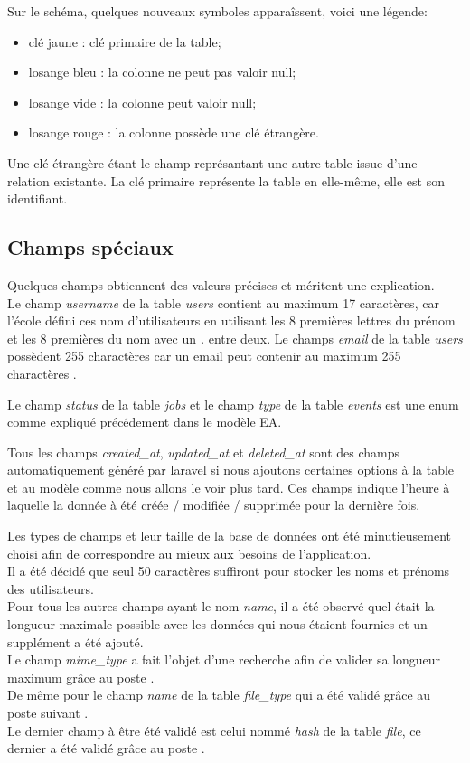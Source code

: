 \documentclass[
    iai, %
    il, %
]{heig-tb}
\begin{document}
Sur le schéma, quelques nouveaux symboles apparaîssent, voici une légende:
\begin{itemize}
    \item clé jaune : clé primaire de la table;
    \item losange bleu : la colonne ne peut pas valoir null;
    \item losange vide : la colonne peut valoir null;
    \item losange rouge : la colonne possède une clé étrangère.
\end{itemize}

Une clé étrangère étant le champ représantant une autre table issue d'une relation existante. La clé primaire représente la table en elle-même, elle est son identifiant.

\subsection{Champs spéciaux}
Quelques champs obtiennent des valeurs précises et méritent une explication.\\
Le champ \emph{username} de la table \emph{users} contient au maximum 17 caractères, car l'école défini ces nom d'utilisateurs en utilisant les 8 premières lettres du prénom et les 8 premières du nom avec un \emph{.} entre deux.
Le champs \emph{email} de la table \emph{users} possèdent 255 charactères car un email peut contenir au maximum 255 charactères \cite{email-length}.

Le champ \emph{status} de la table \emph{jobs} et le champ \emph{type} de la table \emph{events} est une enum comme expliqué précédement dans le modèle EA.

Tous les champs \emph{created_at}, \emph{updated_at} et \emph{deleted_at} sont des champs automatiquement généré par \Gls{laravel} si nous ajoutons certaines options à la table et au modèle comme nous allons le voir plus tard. Ces champs indique l’heure à laquelle la donnée à été créée / modifiée / supprimée pour la dernière fois.

Les types de champs et leur taille de la base de données ont été minutieusement choisi afin de correspondre au mieux aux besoins de l'application. \\
Il a été décidé que seul 50 caractères suffiront pour stocker les noms et prénoms des utilisateurs. \\
Pour tous les autres champs ayant le nom \emph{name}, il a été observé quel était la longueur maximale possible avec les données qui nous étaient fournies et un supplément a été ajouté. \\
Le champ \emph{mime\_type} a fait l'objet d'une recherche afin de valider sa longueur maximum grâce au poste \cite{mime-type-length}. \\
De même pour le champ \emph{name} de la table \emph{file\_type} qui a été validé grâce au poste suivant \cite{extension-length}. \\
Le dernier champ à être été validé est celui nommé \emph{hash} de la table \emph{file}, ce dernier a été validé grâce au poste \cite{hash-256-length}.
\end{document}
